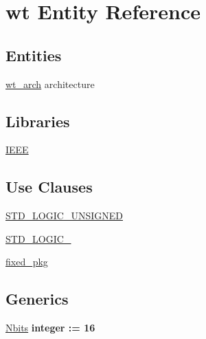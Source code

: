\hypertarget{classwt}{}\section{wt Entity Reference}
\label{classwt}
\subsection*{Entities}
\begin{DoxyCompactItemize}
\item 
\hyperlink{classwt_1_1wt__arch}{wt\+\_\+arch} architecture
\end{DoxyCompactItemize}
\subsection*{Libraries}
 \begin{DoxyCompactItemize}
\item 
\hyperlink{classwt_ae4f03c286607f3181e16b9aa12d0c6d4}{I\+E\+E\+E} 
\end{DoxyCompactItemize}
\subsection*{Use Clauses}
 \begin{DoxyCompactItemize}
\item 
\hyperlink{classwt_a241c3e72dd8024cc8ae831b1b2aed7db}{S\+T\+D\+\_\+\+L\+O\+G\+I\+C\+\_\+\+U\+N\+S\+I\+G\+N\+E\+D}   
\item 
\hyperlink{classwt_aa4b2b25246a821511120e3149b003563}{S\+T\+D\+\_\+\+L\+O\+G\+I\+C\+\_}   
\item 
\hyperlink{classwt_aad86249c80e8c1e7ee1c4748aba748e3}{fixed\+\_\+pkg}   
\end{DoxyCompactItemize}
\subsection*{Generics}
 \begin{DoxyCompactItemize}
\item 
\hyperlink{classwt_a8b45761acb3f2e683677c4eb77d442b0}{Nbits} {\bfseries {\bfseries \textcolor{comment}{integer}\textcolor{vhdlchar}{ }\textcolor{vhdlchar}{ }\textcolor{vhdlchar}{\+:}\textcolor{vhdlchar}{=}\textcolor{vhdlchar}{ }\textcolor{vhdlchar}{ } \textcolor{vhdldigit}{16} \textcolor{vhdlchar}{ }}}
\end{DoxyCompactItemize}
